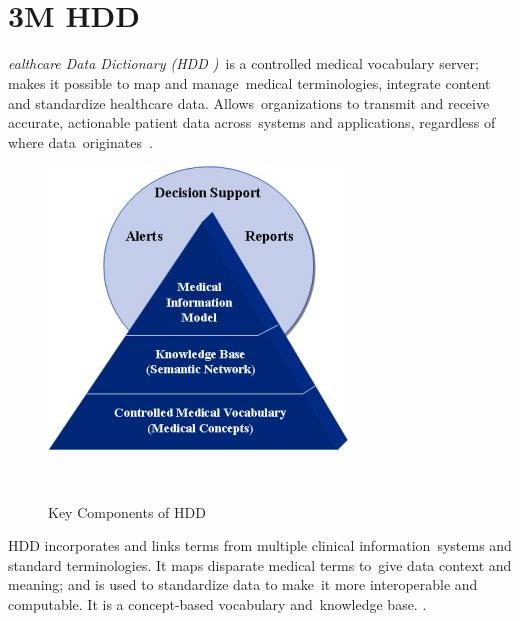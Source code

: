   \section[3M\textsuperscript{\texttrademark} Healthcare Data Dictionary (HDD)]
  {3M\textsuperscript{\texttrademark} HDD}
  \label{sec:hdd}
  
  \textit{ealthcare Data Dictionary (HDD )}\
  is a controlled medical vocabulary server; makes it possible to map and manage\
  medical terminologies, integrate content and standardize healthcare data. Allows\
  organizations to transmit and receive accurate, actionable patient data across\
  systems and applications, regardless of where data\
  originates~\citep{_3M_Healthcare_Data_Dictionary_2013}.\\
  
  \begin{figure}[ht!]
    \label{fig:ikv}
    \centering
    \includegraphics[scale=0.75]{hdd.jpg}
    \caption{Key Components of HDD}\citep{_3M_HDD_Product_Overview_2010}\
  \end{figure}
  
  \noindent HDD incorporates and links terms from multiple clinical information\
  systems and standard terminologies. It maps disparate medical terms to\
  give data context and meaning; and is used to standardize data to make\
  it more interoperable and computable. It is a concept-based vocabulary and\
  knowledge base. \citep{_3M_Healthcare_Data_Dictionary_2013}.\\

